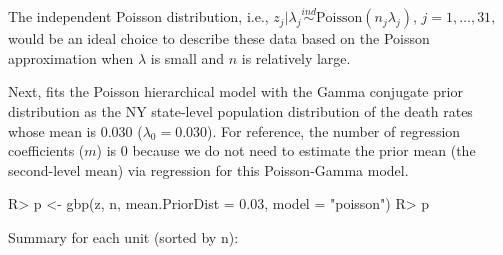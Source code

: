 \documentclass[article]{jss}
\begin{document}
The independent Poisson distribution, i.e.,  $z_{j}\vert \lambda_{j}\stackrel{ind}{\sim} \textrm{Poisson}(n_{j}\lambda_{j})$, $j=1, \ldots, 31,$ would be an ideal choice to describe these data based on the Poisson approximation when $\lambda$ is small and $n$ is relatively large. 


Next,  fits the Poisson hierarchical model with the Gamma conjugate prior distribution as the NY state-level population distribution of the death rates whose mean is 0.030 ($\lambda_{0}=0.030$). For reference, the number of regression coefficients ($m$) is 0 because we do not need to estimate the prior mean (the second-level mean) via regression for this Poisson-Gamma model. 
\begin{CodeChunk}
\begin{CodeInput}
R> p <- gbp(z, n, mean.PriorDist = 0.03, model = "poisson")
R> p
\end{CodeInput}
\begin{CodeOutput}
Summary for each unit (sorted by n):


\end{CodeOutput}
\end{CodeChunk}
\end{document}
